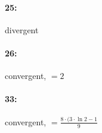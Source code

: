 \documentclass[12pt]{article}
\begin{document}
    \paragraph{25:\\}
    divergent
    \paragraph{26:\\}
    convergent, $=2$\\
    \paragraph{33:\\}
    convergent, $=\frac{8\cdot(3\cdot\ln{2}-1}{9}$

\thispagestyle{fancy}
\end{document}
